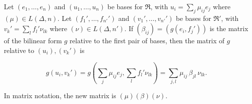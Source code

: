Let $(e_1, \dots, e_n)$ and $(u_1, \dots, u_n)$ be bases for $\mathfrak{R}$, with $u_i = \sum_{j} \mu_{ij} e_j$ where $(\mu) \in L(\Delta, n)$. Let $(f_1', \dots, f_{n'}')$ and $(v_1', \dots, v_{n'}')$ be bases for $\mathfrak{R}'$, with $v_k' = \sum_{l} f_l' \nu_{lk}$ where $(\nu) \in L(\Delta, n')$. If $(\beta_{ij}) = (g(e_i, f_j'))$ is the matrix of the bilinear form $g$ relative to the first pair of bases, then the matrix of $g$ relative to $(u_i), (v_k')$ is

$$g(u_i, v_k') = g\!\left(\sum_j \mu_{ij} e_j, \sum_l f_l' \nu_{lk}\right) = \sum_{j,l} \mu_{ij} \, \beta_{jl} \, \nu_{lk}.$$

In matrix notation, the new matrix is $(\mu) (\beta) (\nu)$.

